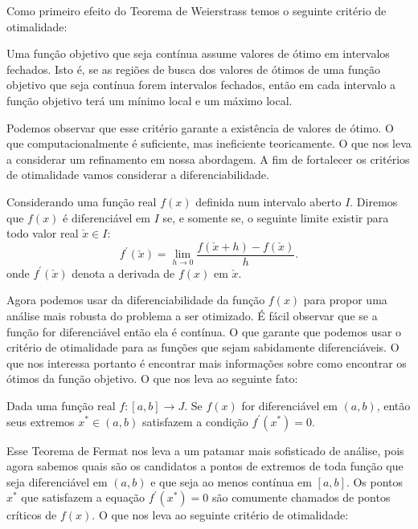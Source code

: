 \par Como primeiro efeito do Teorema de Weierstrass temos o seguinte critério de otimalidade:

\begin{theorem}
  Uma função objetivo que seja contínua assume valores de ótimo em intervalos fechados. Isto é, se as regiões de busca dos valores de ótimos de uma função objetivo que seja contínua forem intervalos fechados, então em cada intervalo a função objetivo terá um mínimo local e um máximo local. 
\end{theorem}


\par Podemos observar que esse critério garante a existência de valores de ótimo. O que computacionalmente é suficiente, mas ineficiente teoricamente. O que nos leva a considerar um refinamento em nossa abordagem. A fim de fortalecer os critérios de otimalidade vamos considerar a diferenciabilidade. 

\begin{definition}
  Considerando uma função real $f(x)$ definida num intervalo aberto $I$. Diremos que $f(x)$ é diferenciável em $I$ se, e somente se, o seguinte limite existir para todo valor real $\check{x} \in I$:
  $$ f^{'}(\check{x})= \lim_{h \rightarrow 0}\frac{f(\check{x}+h)- f(\check{x})}{h}.$$ 
  onde $f^{'}(\check{x})$ denota a derivada de $f(x)$ em $\check{x}$.
\end{definition}

\par Agora podemos usar da diferenciabilidade da função $f(x)$ para propor uma análise mais robusta do problema a ser otimizado. É fácil observar que se a função for diferenciável então ela é contínua. O que garante que podemos usar o critério de otimalidade para as funções que sejam sabidamente diferenciáveis. O que nos interessa portanto é encontrar mais informações sobre como encontrar os ótimos da função objetivo. O que nos leva ao seguinte fato:

\begin{theorem}
  Dada uma função real $f:[a,b] \rightarrow J$. Se $f(x)$ for diferenciável em $(a,b)$, então seus extremos $x^{*} \in (a,b)$ satisfazem a condição $f^{'}(x^*) = 0$. 
\end{theorem}

\par Esse Teorema de Fermat nos leva a um patamar mais sofisticado de análise, pois agora sabemos quais são os candidatos a pontos de extremos de toda função que seja diferenciável em $(a,b)$ e que seja ao menos contínua em $[a,b]$. Os pontos $x^{*}$ que satisfazem a equação $f^{'}(x^*) = 0$ são comumente chamados de pontos críticos de $f(x)$. O que nos leva ao seguinte critério de otimalidade:

